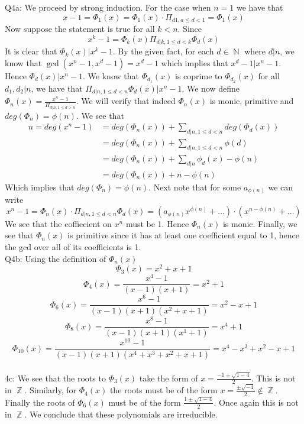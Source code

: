 \documentclass[letterpaper]{article}
\DeclareMathOperator{\N}{\mathbb{N}}
\DeclareMathOperator{\Z}{\mathbb{Z}}
\begin{document}
\noindent Q4a: We proceed by strong induction. For the case when $n=1$ we have that $$x-1 = \Phi_1(x) = \Phi_1(x)\cdot \Pi_{d1,a\leq d<1} = \Phi_1(x)$$
Now suppose the statement is true for all $k< n$. Since $$x^k-1 = \Phi_k(x) \Pi_{d|k,1\leq d <k} \Phi_d(x)$$ It is clear that $\Phi_k(x)| x^{k}-1$. By the given fact, for each $d\in \N$ where $d|n$, we know that $\gcd(x^n-1,x^d-1) = x^d-1$ which implies that $x^d-1 | x^n-1$. Hence $\Phi_d(x)|x^n-1$. We know that $\Phi_{d_1}(x)$ is coprime to $\Phi_{d_2}(x)$ for all $d_1,d_2|n$, we have that $\Pi_{d|n,1\leq d <n} \Phi_{d}(x)|x^{n}-1$.  We now define $\Phi_n(x) = \frac{x^n-1}{\Pi_{d|n,1\leq d >n}}$. We will verify that indeed $\Phi_n(x)$ is monic, primitive and $deg(\Phi_n)=\phi(n)$. We see that 
\begin{align*}
   n= deg(x^n-1)  & = deg(\Phi_n(x)) + \sum_{d|n,1\leq d<n} deg(\Phi_d(x))
   \\ & = deg(\Phi_n(x)) + \sum_{d|n,1 \leq d <n} \phi(d)
   \\ & = deg(\Phi_n(x)) + \sum_{d|n}\phi_d(x) -\phi(n)
   \\ & = deg(\Phi_n(x)) + n - \phi(n)
\end{align*}
Which implies that $deg(\Phi_n)=\phi(n)$. Next note that for some $a_{\phi(n)}$ we can write $$x^{n}-1 = \Phi_n(x) \cdot \Pi_{d|n,1\leq d< n} \Phi_d(x) = (a_{\phi(n)}x^{\phi(n)} + \dots) \cdot (x^{n-\phi(n)} + \dots)$$
We see that the coffiecient on $x^n$ must be 1. Hence $\Phi_n(x)$ is monic. Finally, we see that $\Phi_n(x)$ is primitive since it has at least one coefficient equal to 1, hence the gcd over all of its coefficients is 1. 
\\ \newline Q4b: Using the definition of $\Phi_n(x)$$$\Phi_3(x) = x^2+x+1$$ 
$$\Phi_4(x) = \frac{x^4-1}{(x-1)(x+1)} = x^2+1$$
$$\Phi_6(x) = \frac{x^6-1}{(x-1)(x+1)(x^2+x+1)} = x^2-x+1$$
$$\Phi_8(x) = \frac{x^8-1}{(x-1)(x+1)(x^1+1)} = x^4+1$$
$$\Phi_10(x) = \frac{x^{10}-1}{(x-1)(x+1)(x^4+x^3+x^2+x+1)} = x^4-x^3+x^2-x+1$$
\\ \newline 4c: We see that the roots to $\Phi_3(x)$ take the form of $x = \frac{-1 \pm \sqrt{1-4}}{2}$. This is not in $\Z$. Similarly, for $\Phi_4(x)$ the roots must be of the form $x = \frac{\pm \sqrt{-4}}{2}\notin \Z$. Finally the roots of $\Phi_6(x)$ must be of the form $\frac{1\pm \sqrt{1-4}}{2}$. Once again this is not in $\Z$. We conclude that these polynomials are irreducible.  
\end{document}

